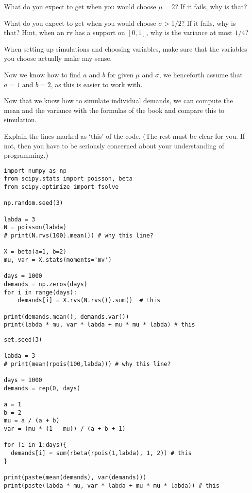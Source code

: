 \begin{exercise}
What do you expect to get when you would choose $\mu=2$? If it fails, why is that?
\end{exercise}

\begin{exercise}
What do you expect to get when you would choose $\sigma > 1/2$? If it fails, why is that? Hint, when an rv has a support on $[0,1]$, why is the variance at most $1/4$?
\end{exercise}

\begin{remark}
When setting up simulations and choosing variables, make sure that the variables you choose actually make any sense.
\end{remark}

Now we know how to find $a$ and $b$ for given $\mu$ and $\sigma$, we henceforth assume that $a=1$ and $b=2$, as this is easier to work with.

\begin{exercise}
Now that we know how to simulate individual demands, we can compute the mean and the variance with the formulas of the book and compare this to simulation.

Explain the lines marked as `this' of the code. (The rest must be clear for you. If not, then you have to be seriously concerned about your understanding of programming.)

\begin{verbatim}
import numpy as np
from scipy.stats import poisson, beta
from scipy.optimize import fsolve

np.random.seed(3)

labda = 3
N = poisson(labda)
# print(N.rvs(100).mean()) # why this line?

X = beta(a=1, b=2)
mu, var = X.stats(moments='mv')

days = 1000
demands = np.zeros(days)
for i in range(days):
    demands[i] = X.rvs(N.rvs()).sum()  # this

print(demands.mean(), demands.var())
print(labda * mu, var * labda + mu * mu * labda) # this
\end{verbatim}

\begin{verbatim}
set.seed(3)

labda = 3
# print(mean(rpois(100,labda))) # why this line?

days = 1000
demands = rep(0, days)

a = 1
b = 2
mu = a / (a + b)
var = (mu * (1 - mu)) / (a + b + 1)

for (i in 1:days){
  demands[i] = sum(rbeta(rpois(1,labda), 1, 2)) # this
}

print(paste(mean(demands), var(demands)))
print(paste(labda * mu, var * labda + mu * mu * labda)) # this
\end{verbatim}
\end{exercise}

